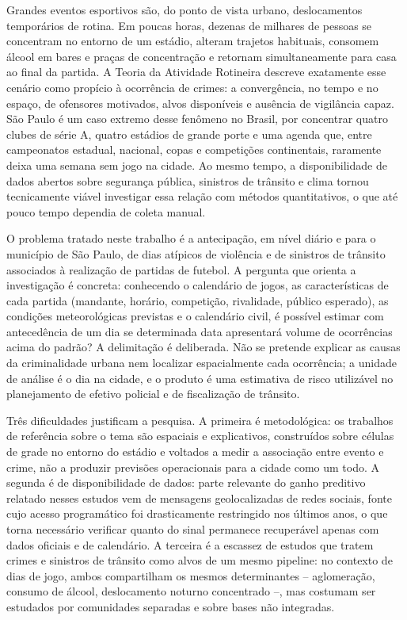 \documentclass[12pt]{article}
\begin{document}
Grandes eventos esportivos são, do ponto de vista urbano, deslocamentos
temporários de rotina. Em poucas horas, dezenas de milhares de pessoas se
concentram no entorno de um estádio, alteram trajetos habituais, consomem
álcool em bares e praças de concentração e retornam simultaneamente para casa
ao final da partida. A Teoria da Atividade Rotineira \cite{cohen1979} descreve
exatamente esse cenário como propício à ocorrência de crimes: a convergência,
no tempo e no espaço, de ofensores motivados, alvos disponíveis e ausência de
vigilância capaz. São Paulo é um caso extremo desse fenômeno no Brasil, por
concentrar quatro clubes de série A, quatro estádios de grande porte e uma
agenda que, entre campeonatos estadual, nacional, copas e competições
continentais, raramente deixa uma semana sem jogo na cidade. Ao mesmo tempo, a
disponibilidade de dados abertos sobre segurança pública, sinistros de trânsito
e clima tornou tecnicamente viável investigar essa relação com métodos
quantitativos, o que até pouco tempo dependia de coleta manual.

O problema tratado neste trabalho é a antecipação, em nível diário e para o
município de São Paulo, de dias atípicos de violência e de sinistros de
trânsito associados à realização de partidas de futebol. A pergunta que
orienta a investigação é concreta: conhecendo o calendário de jogos, as
características de cada partida (mandante, horário, competição, rivalidade,
público esperado), as condições meteorológicas previstas e o calendário civil,
é possível estimar com antecedência de um dia se determinada data apresentará
volume de ocorrências acima do padrão? A delimitação é deliberada. Não se
pretende explicar as causas da criminalidade urbana nem localizar
espacialmente cada ocorrência; a unidade de análise é o dia na cidade, e o
produto é uma estimativa de risco utilizável no planejamento de efetivo
policial e de fiscalização de trânsito.

Três dificuldades justificam a pesquisa. A primeira é metodológica: os
trabalhos de referência sobre o tema \cite{kurland2014,ristea2018,ristea2020}
são espaciais e explicativos, construídos sobre células de grade no entorno do
estádio e voltados a medir a associação entre evento e crime, não a produzir
previsões operacionais para a cidade como um todo. A segunda é de
disponibilidade de dados: parte relevante do ganho preditivo relatado nesses
estudos vem de mensagens geolocalizadas de redes sociais, fonte cujo acesso
programático foi drasticamente restringido nos últimos anos, o que torna
necessário verificar quanto do sinal permanece recuperável apenas com dados
oficiais e de calendário. A terceira é a escassez de estudos que tratem crimes
e sinistros de trânsito como alvos de um mesmo pipeline: no contexto de dias de
jogo, ambos compartilham os mesmos determinantes -- aglomeração, consumo de
álcool, deslocamento noturno concentrado --, mas costumam ser estudados por
comunidades separadas e sobre bases não integradas.
\end{document}
